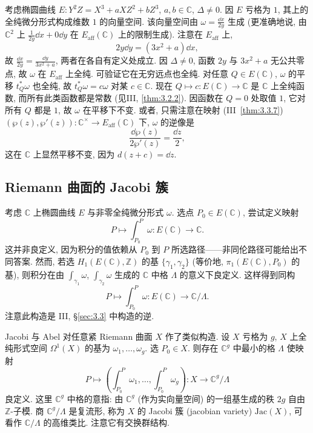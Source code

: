 考虑椭圆曲线 $E\colon Y^2Z = X^3 + aXZ^2 + bZ^3$, $a, b\in\mathbb{C}$, $\Delta\neq 0$. 因 $E$ 亏格为 $1$, 其上的全纯微分形式构成维数 $1$ 的向量空间. 该向量空间由 $\omega = \frac{\dd x}{2y}$ 生成 (更准确地说, 由 $\mathbb{C}^2$ 上 $\frac{1}{2y}\dd x + 0\dd y$ 在 $E_{\mathrm{aff}}(\mathbb{C})$ 上的限制生成). 注意在 $E_{\mathrm{aff}}$ 上,
\[
2y\dd y = (3x^2 + a)\dd x,
\]
故 $\frac{\dd x}{2y} = \frac{\dd y}{3x^2 + a}$, 两者在各自有定义处成立. 因 $\Delta\neq 0$, 函数 $2y$ 与 $3x^2 + a$ 无公共零点, 故 $\omega$ 在 $E_{\mathrm{aff}}$ 上全纯. 可验证它在无穷远点也全纯. 对任意 $Q\in E(\mathbb{C})$, $\omega$ 的平移 $t_Q^*\omega$ 也全纯, 故 $t_Q^*\omega = c\omega$ 对某 $c\in\mathbb{C}$. 现在 $Q\mapsto c\colon E(\mathbb{C})\to\mathbb{C}$ 是 $\mathbb{C}$ 上全纯函数, 而所有此类函数都是常数 (见III, \ref{thm:3.2.2}). 因函数在 $Q = 0$ 处取值 $1$, 它对所有 $Q$ 都是 $1$, 故 $\omega$ 在平移下不变. 或者, 只需注意在映射 (III~\ref{thm:3.3.7}) $(\wp(z), \wp'(z))\colon\mathbb{C}^{\times}\to E_{\mathrm{aff}}(\mathbb{C})$ 下, $\omega$ 的逆像是
\[
\frac{\dd \wp(z)}{2\wp'(z)} = \frac{\dd z}{2},
\]
这在 $\mathbb{C}$ 上显然平移不变, 因为 $d(z + c) = \dd z$.

\subsection*{Riemann 曲面的 Jacobi 簇}

考虑 $\mathbb{C}$ 上椭圆曲线 $E$ 与非零全纯微分形式 $\omega$. 选点 $P_0\in E(\mathbb{C})$, 尝试定义映射
\[
P\mapsto\int_{P_0}^{P}\omega\colon E(\mathbb{C})\to\mathbb{C}.
\]
这并非良定义, 因为积分的值依赖从 $P_0$ 到 $P$ 所选路径——非同伦路径可能给出不同答案. 然而, 若选 $H_1(E(\mathbb{C}), \mathbb{Z})$ 的基 $\{\gamma_1, \gamma_2\}$ (等价地, $\pi_1(E(\mathbb{C}), P_0)$ 的基), 则积分在由 $\int_{\gamma_1}\omega$, $\int_{\gamma_2}\omega$ 生成的 $\mathbb{C}$ 中格 $\Lambda$ 的意义下良定义. 这样得到同构
\[
P\mapsto\int_{P_0}^{P}\omega\colon E(\mathbb{C})\to\mathbb{C}/\Lambda.
\]
注意此构造是 III, \S\ref{sec:3.3} 中构造的逆.

Jacobi 与 Abel 对任意紧 Riemann 曲面 $X$ 作了类似构造. 设 $X$ 亏格为 $g$, $X$ 上全纯形式空间 $\Omega^1(X)$ 的基为 $\omega_1, \dots, \omega_g$. 选 $P_0\in X$. 则存在 $\mathbb{C}^g$ 中最小的格 $\Lambda$ 使映射
\[
P\mapsto\left(\int_{P_0}^{P}\omega_1, \dots, \int_{P_0}^{P}\omega_g\right)\colon X\to\mathbb{C}^g/\Lambda
\]
良定义. 这里 $\mathbb{C}^g$ 中格的意指: 由 $\mathbb{C}^g$ (作为实向量空间) 的一组基生成的秩 $2g$ 自由 $\mathbb{Z}$-子模. 商 $\mathbb{C}^g/\Lambda$ 是复流形, 称为 $X$ 的 Jacobi 簇 (jacobian variety) $\mathrm{Jac}(X)$, 可看作 $\mathbb{C}/\Lambda$ 的高维类比. 注意它有交换群结构.

